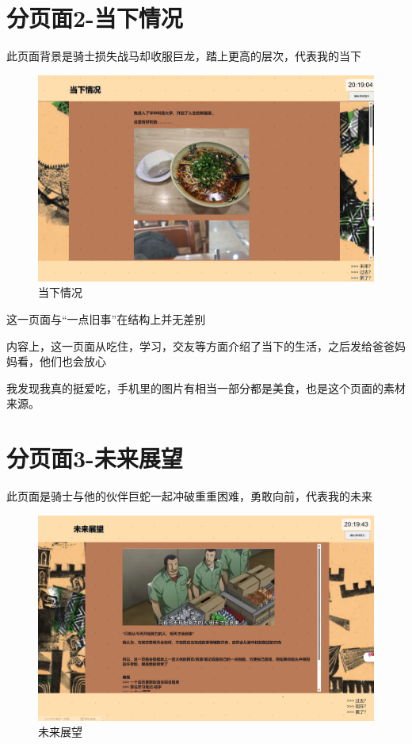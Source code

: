 \documentclass[supercite]{Experimental_Report}
\theoremstyle{definition}
\begin{document}
\section{分页面2-当下情况}

此页面背景是骑士损失战马却收服巨龙，踏上更高的层次，代表我的当下

\begin{figure}[htb]
	\begin{center}
		\includegraphics[scale=0.40]{images/dangxia-1.png}
		\caption{当下情况}
		\label{fig4-1}
	\end{center}
\end{figure}
这一页面与“一点旧事”在结构上并无差别

内容上，这一页面从吃住，学习，交友等方面介绍了当下的生活，之后发给爸爸妈妈看，他们也会放心

我发现我真的挺爱吃，手机里的图片有相当一部分都是美食，也是这个页面的素材来源。

\newpage
\section{分页面3-未来展望}

此页面是骑士与他的伙伴巨蛇一起冲破重重困难，勇敢向前，代表我的未来

\begin{figure}[htb]
	\begin{center}
		\includegraphics[scale=0.40]{images/weilai-1.png}
		\caption{未来展望}
		\label{fig5-1}
	\end{center}
\end{figure}
\end{document}
